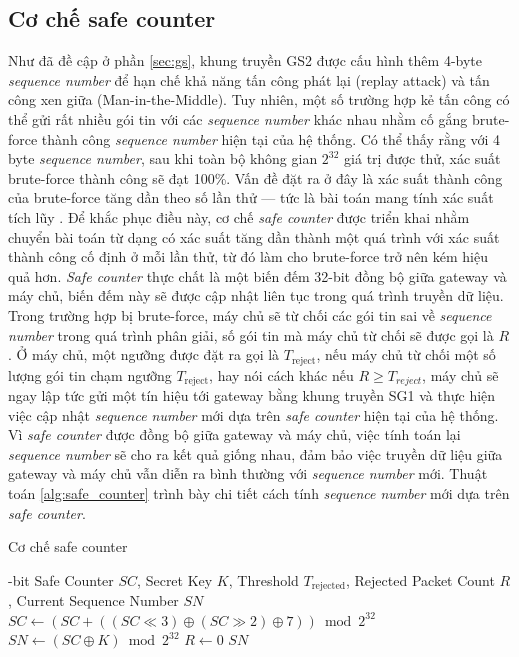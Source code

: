 \subsection{Cơ chế safe counter}
\label{sec:safe_counter}
Như đã đề cập ở phần \ref{sec:gs}, khung truyền GS2 được cấu hình thêm 4-byte \textit{sequence number} để hạn chế khả năng tấn công phát lại (replay attack) và tấn công xen giữa (Man-in-the-Middle). Tuy nhiên, một số trường hợp kẻ tấn công có thể gửi rất nhiều gói tin với các \textit{sequence number} khác nhau nhằm cố gắng brute-force thành công \textit{sequence number} hiện tại của hệ thống. Có thể thấy rằng với 4 byte \textit{sequence number}, sau khi toàn bộ không gian $2^{32}$ giá trị được thử, xác suất brute-force thành công sẽ đạt 100\%. Vấn đề đặt ra ở đây là xác suất thành công của brute-force tăng dần theo số lần thử — tức là bài toán mang tính xác suất tích lũy \cite{cumulative}. Để khắc phục điều này, cơ chế \textit{safe counter} được triển khai nhằm chuyển bài toán từ dạng có xác suất tăng dần thành một quá trình với xác suất thành công cố định ở mỗi lần thử, từ đó làm cho brute-force trở nên kém hiệu quả hơn. \textit{Safe counter} thực chất là một biến đếm 32-bit đồng bộ giữa gateway và máy chủ, biến đếm này sẽ được cập nhật liên tục trong quá trình truyền dữ liệu. Trong trường hợp bị brute-force, máy chủ sẽ từ chối các gói tin sai về \textit{sequence number} trong quá trình phân giải, số gói tin mà máy chủ từ chối sẽ được gọi là $R$. Ở máy chủ, một ngưỡng được đặt ra gọi là \(T_{\text{reject}} \), nếu máy chủ từ chối một số lượng gói tin chạm ngưỡng \(T_{\text{reject}} \), hay nói cách khác nếu $R \geq T_{reject}$, máy chủ sẽ ngay lập tức gửi một tín hiệu tới gateway bằng khung truyền SG1 và thực hiện việc cập nhật \textit{sequence number} mới dựa trên \textit{safe counter} hiện tại của hệ thống. Vì \textit{safe counter} được đồng bộ giữa gateway và máy chủ, việc tính toán lại \textit{sequence number} sẽ cho ra kết quả giống nhau, đảm bảo việc truyền dữ liệu giữa gateway và máy chủ vẫn diễn ra bình thường với \textit{sequence number} mới. Thuật toán \ref{alg:safe_counter} trình bày chi tiết cách tính \textit{sequence number} mới dựa trên \textit{safe counter}.

\begin{algorithm}[ht]
\caption{Cơ chế safe counter}
\small
\label{alg:safe_counter}
\begin{algorithmic}[1]
-bit Safe Counter $SC$, Secret Key $K$, Threshold $T_{\text{rejected}}$, Rejected Packet Count $R$, Current Sequence Number $SN$
\State $SC \gets (SC + ((SC \ll 3) \oplus (SC \gg 2) \oplus 7)) \bmod 2^{32}$
    \State $SN \gets (SC \oplus K) \bmod 2^{32}$
    \State $R \gets 0$
\EndIf
\Return $SN$
\end{algorithmic}
\end{algorithm}

